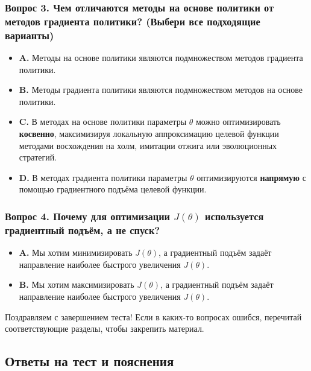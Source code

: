 \documentclass[11pt,a4paper]{article}
\begin{document}
\subsubsection{Вопрос 3. Чем отличаются методы на основе политики от методов градиента политики? (Выбери все подходящие варианты)}\label{q3-whats-the-difference-between-policy-based-methods-and-policy-gradient-methods-check-all-that-apply}

\begin{itemize}
\tightlist
\item
  \textbf{A.} Методы на основе политики являются подмножеством методов градиента политики.
\item
  \textbf{B.} Методы градиента политики являются подмножеством методов на основе политики.
\item
  \textbf{C.} В методах на основе политики параметры \(\theta\) можно оптимизировать \textbf{косвенно}, максимизируя локальную аппроксимацию целевой функции методами восхождения на холм, имитации отжига или эволюционных стратегий.
\item
  \textbf{D.} В методах градиента политики параметры \(\theta\) оптимизируются \textbf{напрямую} с помощью градиентного подъёма целевой функции.
\end{itemize}

\subsubsection{\texorpdfstring{Вопрос 4. Почему для оптимизации \(J(\theta)\) используется градиентный подъём, а не спуск?}{Вопрос 4. Почему используется градиентный подъём, а не спуск?}}\label{q4-why-do-we-use-gradient-ascent-instead-of-gradient-descent-to-optimize-jtheta}

\begin{itemize}
\tightlist
\item
  \textbf{A.} Мы хотим минимизировать \(J(\theta)\), а градиентный подъём задаёт направление наиболее быстрого увеличения \(J(\theta)\).
\item
  \textbf{B.} Мы хотим максимизировать \(J(\theta)\), а градиентный подъём задаёт направление наиболее быстрого увеличения \(J(\theta)\).
\end{itemize}

Поздравляем с завершением теста! Если в каких-то вопросах ошибся, перечитай соответствующие разделы, чтобы закрепить материал.

\subsection{Ответы на тест и пояснения}\label{quiz-solutions-and-explanations}
\end{document}
